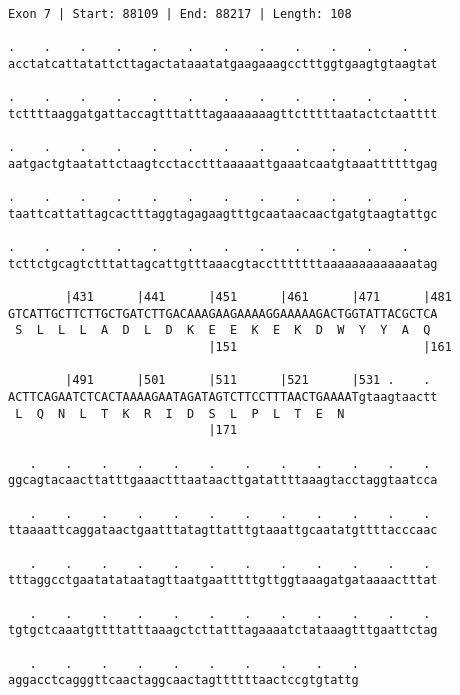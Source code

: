 \documentclass{article}
\begin{document}
\newpage
\begin{Verbatim}
Exon 7 | Start: 88109 | End: 88217 | Length: 108
 
.    .    .    .    .    .    .    .    .    .    .    .    
acctatcattatattcttagactataaatatgaagaaagcctttggtgaagtgtaagtat
  
.    .    .    .    .    .    .    .    .    .    .    .    
tcttttaaggatgattaccagtttatttagaaaaaaagttctttttaatactctaatttt
  
.    .    .    .    .    .    .    .    .    .    .    .    
aatgactgtaatattctaagtcctacctttaaaaattgaaatcaatgtaaattttttgag
  
.    .    .    .    .    .    .    .    .    .    .    .    
taattcattattagcactttaggtagagaagtttgcaataacaactgatgtaagtattgc
  
.    .    .    .    .    .    .    .    .    .    .    .    
tcttctgcagtctttattagcattgtttaaacgtacctttttttaaaaaaaaaaaaatag
  
        |431      |441      |451      |461      |471      |481
GTCATTGCTTCTTGCTGATCTTGACAAAGAAGAAAAGGAAAAAGACTGGTATTACGCTCA
 S  L  L  L  A  D  L  D  K  E  E  K  E  K  D  W  Y  Y  A  Q 
                            |151                          |161
  
        |491      |501      |511      |521      |531 .    . 
ACTTCAGAATCTCACTAAAAGAATAGATAGTCTTCCTTTAACTGAAAATgtaagtaactt
 L  Q  N  L  T  K  R  I  D  S  L  P  L  T  E  N             
                            |171                            
  
   .    .    .    .    .    .    .    .    .    .    .    . 
ggcagtacaacttatttgaaactttaataacttgatattttaaagtacctaggtaatcca
  
   .    .    .    .    .    .    .    .    .    .    .    . 
ttaaaattcaggataactgaatttatagttatttgtaaattgcaatatgttttacccaac
  
   .    .    .    .    .    .    .    .    .    .    .    . 
tttaggcctgaatatataatagttaatgaatttttgttggtaaagatgataaaactttat
  
   .    .    .    .    .    .    .    .    .    .    .    . 
tgtgctcaaatgttttatttaaagctcttatttagaaaatctataaagtttgaattctag
  
   .    .    .    .    .    .    .    .    .    .
aggacctcagggttcaactaggcaactagttttttaactccgtgtattg
\end{Verbatim}
\newpage
\end{document}
